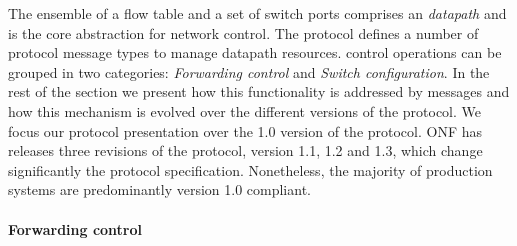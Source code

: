 The ensemble of a flow table and a set of switch ports comprises an \of
\emph{datapath} and is the core abstraction for network control.  The protocol
defines a number of protocol message types to manage datapath resources. \of 
control operations can be grouped in two categories:
\emph{Forwarding control} and \emph{Switch configuration}. In the rest of the
section we present how this functionality is addressed by \of messages and how
this mechanism is evolved over the different versions of the protocol. We
focus our protocol presentation over the 1.0 version of the protocol.
ONF has releases three revisions of the
protocol, version 1.1, 1.2 and 1.3, which change significantly the protocol
specification. Nonetheless, the majority of production systems are predominantly 
version 1.0 compliant.

\paragraph{Forwarding control}

